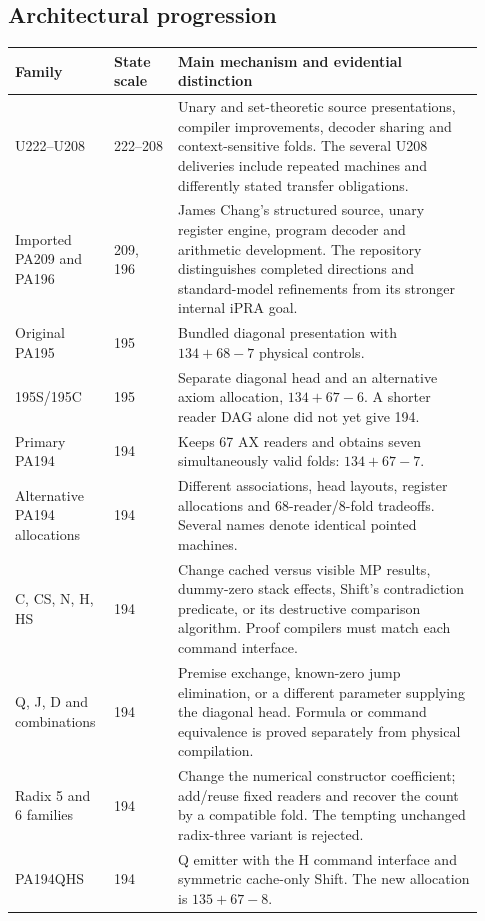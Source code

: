 \documentclass[11pt,letterpaper]{article}
\begin{document}
\subsection{Architectural progression}

\begin{longtable}{@{}p{0.18\linewidth}p{0.13\linewidth}p{0.62\linewidth}@{}}
\toprule Family & State scale & Main mechanism and evidential distinction\\\midrule\endhead
U222--U208 & 222--208 & Unary and set-theoretic source presentations,
 compiler improvements, decoder sharing and context-sensitive folds.
 The several U208 deliveries include repeated machines and differently
 stated transfer obligations.\\[4pt]
Imported PA209 and PA196 & 209, 196 & James Chang's structured source,
 unary register engine, program decoder and arithmetic development.
 The repository distinguishes completed directions and standard-model
 refinements from its stronger internal iPRA goal.\\[4pt]
Original PA195 & 195 & Bundled diagonal presentation with
 $134+68-7$ physical controls.\\[4pt]
195S/195C & 195 & Separate diagonal head and an alternative
 axiom allocation, $134+67-6$. A shorter reader DAG alone did not yet
 give 194.\\[4pt]
Primary PA194 & 194 & Keeps 67 AX readers and obtains seven
 simultaneously valid folds: $134+67-7$.\\[4pt]
Alternative PA194 allocations & 194 & Different associations, head
 layouts, register allocations and $68$-reader/$8$-fold tradeoffs.
 Several names denote identical pointed machines.\\[4pt]
C, CS, N, H, HS & 194 & Change cached versus visible MP results,
 dummy-zero stack effects, Shift's contradiction predicate, or its
 destructive comparison algorithm. Proof compilers must match each
 command interface.\\[4pt]
Q, J, D and combinations & 194 & Premise exchange, known-zero jump elimination,
 or a different parameter supplying the diagonal head. Formula or
 command equivalence is proved separately from physical compilation.\\[4pt]
Radix 5 and 6 families & 194 & Change the numerical constructor
 coefficient; add/reuse fixed readers and recover the count by a
 compatible fold. The tempting unchanged radix-three variant is rejected.\\[4pt]
PA194QHS & 194 & Q emitter with the H command interface and symmetric
 cache-only Shift. The new allocation is $135+67-8$.\\
\bottomrule
\end{longtable}
\end{document}
